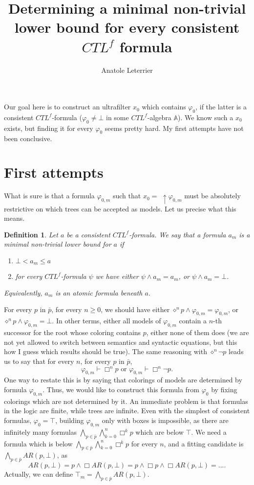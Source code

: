 \documentclass[10pt]{article}
\title{Determining a minimal non-trivial lower bound for every consistent $CTL^f$ formula}
\author{Anatole Leterrier}
\newcommand{\A}{{\mathbb A}}
\newtheorem{definition}{Definition}
\begin{document}
\maketitle
Our goal here is to construct an ultrafilter $x_0$ which contains $\varphi_0$, if the latter is a consistent $CTL^f$-formula ($\varphi_0\not=\bot$ in some $CTL^f$-algebra $\A$). We know such a $x_0$ exists, but finding it for every $\varphi_0$ seems pretty hard. My first attempts have not been conclusive.

\section*{First attempts}
What is sure is that a formula $\varphi_{0,m}$ such that $x_0 =$ $\uparrow\varphi_{0,m}$ must be absolutely restrictive on which trees can be accepted as models. Let us precise what this means. 
\begin{definition}\label{phi_m}
    Let $a$ be a consistent $CTL^f$-formula. We say that a formula $a_m$ is a \emph{minimal non-trivial lower bound for $a$} if 
    \begin{enumerate}
        \item $\bot<a_m\leq a$
        \item for every $CTL^f$-formula $\psi$ we have either $\psi\wedge a_m=a_m$, or $\psi\wedge a_m=\bot$.
    \end{enumerate}
    Equivalently, $a_m$ is an atomic formula beneath $a$.
\end{definition}
For every $p$ in $\bar{p}$, for every $n \geq 0$, we should have either $\diamond^np \wedge \varphi_{0,m} = \varphi_{0,m}$, or $\diamond^np \wedge \varphi_{0,m} =\bot$. In other terms, either all models of $\varphi_{0,m}$ contain a $n$-th successor for the root whose coloring contains $p$, either none of them does (we are not yet allowed to switch between semantics and syntactic equations, but this how I guess which results should be true). The same reasoning with $\diamond^n\neg p$ leads us to say that for every $n$, for every $p$ in $\bar{p}$, \[\varphi_{0,m}\vdash\Box^n p\mbox{ or } \varphi_{0,m}\vdash\Box^n\neg p.\]
One way to restate this is by saying that colorings of models are determined by formula $\varphi_{0,m}$. Thus, we would like to construct this formula from $\varphi_0$ by fixing colorings which are not determined by it. An immediate problem is that formulas in the logic are finite, while trees are infinite. Even with the simplest of consistent formulas, $\varphi_0 = \top$, building $\varphi_{0,m}$ only with boxes is impossible, as there are infinitely many formulas $\bigwedge_{p\in\bar{p}}\bigwedge_{k=0}^n\Box^k p$ which are below $\top$. We need a formula which is below $\bigwedge_{p\in\bar{p}}\bigwedge_{k=0}^n\Box^k p$ for every $n$, and a fitting candidate is $\bigwedge_{p\in\bar{p}}AR(p,\bot)$, as \[AR(p,\bot)=p\wedge\Box AR(p,\bot)=p\wedge\Box p\wedge \Box AR(p,\bot)=... .\] Actually, we can define $\top_m=\bigwedge_{p\in\bar{p}}AR(p,\bot)$. 
\end{document}
